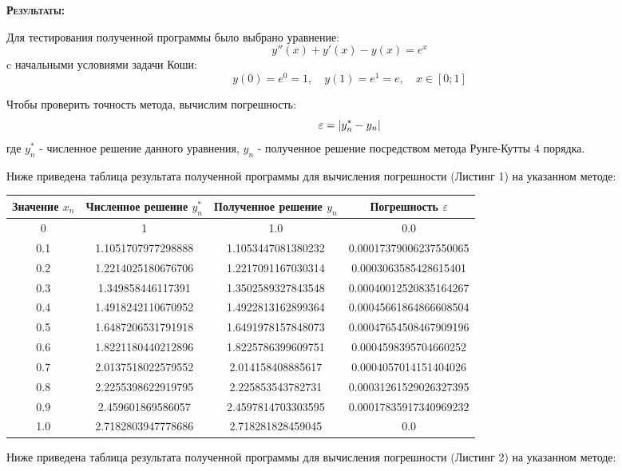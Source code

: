 \documentclass [12pt]{article}
\DeclarePairedDelimiter{\abs}{\lvert}{\rvert}
\begin{document}
\textsc{\textbf{Результаты:}}

Для тестирования полученной программы было выбрано уравнение: $$y''(x)+y'(x)-y(x)=e^x$$
c начальными условиями задачи Коши: $$ y(0)=e^0=1, \quad y(1)=e^1=e, \quad x \in [0;1] $$

Чтобы проверить точность метода, вычислим погрешность: $$\varepsilon=\abs{y^{*}_{n}-y_{n}}$$ где $y^{*}_{n}$ - численное решение данного уравнения, $y_{n}$ - полученное решение посредством метода Рунге-Кутты 4 порядка. 

Ниже приведена таблица результата полученной программы для вычисления погрешности (Листинг 1) на указанном методе:

\begin{center}
\begin{tabular}{ |c|c|c|c| }
  \hline
  Значение $x_{n}$ & Численное решение $y^{*}_{n}$ & Полученное решение $y_{n}$ & Погрешность $\varepsilon$ \\ \hline
  0 & 1 & 1.0 & 0.0 \\ \hline
  0.1 & 1.1051707977298888 & 1.1053447081380232 & 0.00017379006237550065 \\ \hline
  0.2 & 1.2214025180676706 & 1.2217091167030314 & 0.0003063585428615401 \\ \hline
  0.3 & 1.349858446117391 & 1.3502589327843548 & 0.00040012520835164267 \\ \hline
  0.4 & 1.4918242110670952 & 1.4922813162899364 & 0.00045661864866608504 \\ \hline
  0.5 & 1.6487206531791918 & 1.6491978157848073 & 0.00047654508467909196 \\ \hline
  0.6 & 1.8221180440212896 & 1.8225786399609751 & 0.0004598395704660252 \\ \hline
  0.7 & 2.0137518022579552 & 2.014158408885617 & 0.0004057014151404026 \\ \hline
  0.8 & 2.2255398622919795 & 2.225853543782731 & 0.00031261529026327395 \\ \hline
  0.9 & 2.459601869586057 & 2.4597814703303595 & 0.00017835917340969232 \\ \hline
  1.0 & 2.7182803947778686 & 2.718281828459045 & 0.0 \\ \hline
\end{tabular}
\end{center}

Ниже приведена таблица результата полученной программы для вычисления погрешности (Листинг 2) на указанном методе:
\end{document}
